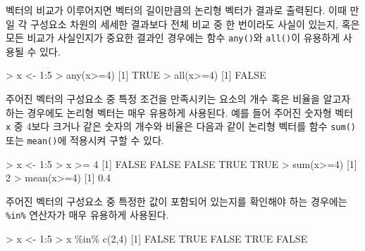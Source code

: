 \documentclass[
]{book}
\newenvironment{Shaded}{\begin{snugshade}}{\end{snugshade}}
\newcommand{\ConstantTok}[1]{\textcolor[rgb]{0.00,0.00,0.00}{#1}}
\newcommand{\DecValTok}[1]{\textcolor[rgb]{0.00,0.00,0.81}{#1}}
\newcommand{\FloatTok}[1]{\textcolor[rgb]{0.00,0.00,0.81}{#1}}
\newcommand{\FunctionTok}[1]{\textcolor[rgb]{0.00,0.00,0.00}{#1}}
\newcommand{\NormalTok}[1]{#1}
\newcommand{\OtherTok}[1]{\textcolor[rgb]{0.56,0.35,0.01}{#1}}
\newcommand{\SpecialCharTok}[1]{\textcolor[rgb]{0.00,0.00,0.00}{#1}}
\begin{document}
벡터의 비교가 이루어지면 벡터의 길이만큼의 논리형 벡터가 결과로 출력된다. 이때 만일
각 구성요소 차원의 세세한 결과보다 전체 비교 중 한 번이라도 사실이 있는지, 혹은 모든 비교가 사실인지가 중요한 결과인 경우에는 함수 \texttt{any()}와 \texttt{all()}이 유용하게 사용될 수 있다.

\begin{Shaded}
\begin{Highlighting}[]
\SpecialCharTok{\textgreater{}}\NormalTok{ x }\OtherTok{\textless{}{-}} \DecValTok{1}\SpecialCharTok{:}\DecValTok{5}
\SpecialCharTok{\textgreater{}} \FunctionTok{any}\NormalTok{(x}\SpecialCharTok{\textgreater{}=}\DecValTok{4}\NormalTok{)}
\NormalTok{[}\DecValTok{1}\NormalTok{] }\ConstantTok{TRUE}
\SpecialCharTok{\textgreater{}} \FunctionTok{all}\NormalTok{(x}\SpecialCharTok{\textgreater{}=}\DecValTok{4}\NormalTok{)}
\NormalTok{[}\DecValTok{1}\NormalTok{] }\ConstantTok{FALSE}
\end{Highlighting}
\end{Shaded}

주어진 벡터의 구성요소 중 특정 조건을 만족시키는 요소의 개수 혹은 비율을 알고자
하는 경우에도 논리형 벡터는 매우 유용하게 사용된다. 예를 들어 주어진 숫자형 벡터 \texttt{x}
중 4보다 크거나 같은 숫자의 개수와 비율은 다음과 같이 논리형 벡터를 함수 \texttt{sum()} 또는
\texttt{mean()}에 적용시켜 구할 수 있다.

\begin{Shaded}
\begin{Highlighting}[]
\SpecialCharTok{\textgreater{}}\NormalTok{ x }\OtherTok{\textless{}{-}} \DecValTok{1}\SpecialCharTok{:}\DecValTok{5}
\SpecialCharTok{\textgreater{}}\NormalTok{ x }\SpecialCharTok{\textgreater{}=} \DecValTok{4}
\NormalTok{[}\DecValTok{1}\NormalTok{] }\ConstantTok{FALSE} \ConstantTok{FALSE} \ConstantTok{FALSE}  \ConstantTok{TRUE}  \ConstantTok{TRUE}
\SpecialCharTok{\textgreater{}} \FunctionTok{sum}\NormalTok{(x}\SpecialCharTok{\textgreater{}=}\DecValTok{4}\NormalTok{)}
\NormalTok{[}\DecValTok{1}\NormalTok{] }\DecValTok{2}
\SpecialCharTok{\textgreater{}} \FunctionTok{mean}\NormalTok{(x}\SpecialCharTok{\textgreater{}=}\DecValTok{4}\NormalTok{)}
\NormalTok{[}\DecValTok{1}\NormalTok{] }\FloatTok{0.4}
\end{Highlighting}
\end{Shaded}

주어진 벡터의 구성요소 중 특정한 값이 포함되어 있는지를 확인해야 하는 경우에는
\texttt{\%in\%} 연산자가 매우 유용하게 사용된다.

\begin{Shaded}
\begin{Highlighting}[]
\SpecialCharTok{\textgreater{}}\NormalTok{ x }\OtherTok{\textless{}{-}} \DecValTok{1}\SpecialCharTok{:}\DecValTok{5}
\SpecialCharTok{\textgreater{}}\NormalTok{ x }\SpecialCharTok{\%in\%} \FunctionTok{c}\NormalTok{(}\DecValTok{2}\NormalTok{,}\DecValTok{4}\NormalTok{)}
\NormalTok{[}\DecValTok{1}\NormalTok{] }\ConstantTok{FALSE}  \ConstantTok{TRUE} \ConstantTok{FALSE}  \ConstantTok{TRUE} \ConstantTok{FALSE}
\end{Highlighting}
\end{Shaded}
\end{document}
